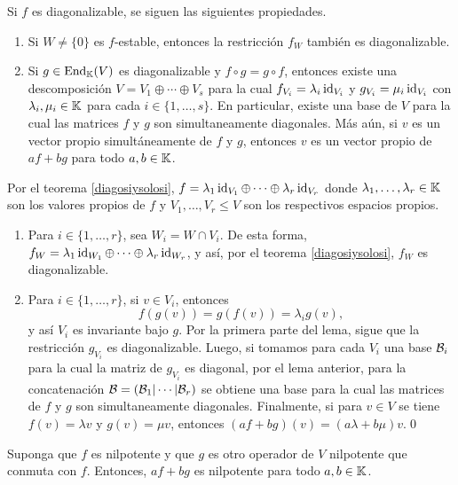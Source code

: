 \begin{lema}
Si $f$ es diagonalizable, se siguen las siguientes propiedades.
\begin{enumerate}
\item Si $W\ne\{0\}$ es $f$-estable, entonces la restricci\'on $f_{W}$ tambi\'en es diagonalizable. 
\item Si $g\in\operatorname{End}_{\mathbb{K}}(V)$ es diagonalizable y $f\circ g=g\circ f$, entonces existe una descomposición $V=V_1\oplus\cdots\oplus V_s$ para la cual $f_{V_i}=\lambda_i\operatorname{id}_{V_i}$ y $g_{V_i}=\mu_i\operatorname{id}_{V_i}$ con $\lambda_i,\mu_i\in \mathbb{K}$ para cada $i\in\{1,\ldots,s\}$. En particular, existe una base de $V$ para la cual las matrices $f$ y $g$ son simultaneamente diagonales. Más aún, si $v$ es un vector propio simult\'aneamente de $f$ y $g$, entonces $v$ es un vector propio de $af+bg$ para todo $a,b\in \mathbb{K}$.
\end{enumerate}
\end{lema}

\dem Por el teorema \ref{diagosiysolosi}, $f=\lambda_1\operatorname{id}_{V_1}\oplus\cdots\oplus\lambda_r\operatorname{id}_{V_r}$ donde $\lambda_1,\ldots,\lambda_r\in\mathbb{K}$ son los valores propios de $f$ y $V_1,\ldots,V_r\le V$ son los respectivos espacios propios.
  \begin{enumerate} 
    \item Para $i\in\{1,\ldots,r\}$, sea $W_i=W\cap V_i$. De esta forma, $f_W=\lambda_1\operatorname{id}_{W_1}\oplus\cdots\oplus\lambda_r\operatorname{id}_{W_r}$, y así, por el teorema \ref{diagosiysolosi}, $f_W$ es diagonalizable.
    \item Para $i\in\{1,\ldots,r\}$, si $v\in V_i$, entonces
      \[
      f\left(g(v)\right)=g\left(f(v)\right)=\lambda_ig(v),
      \]
      y así $V_i$ es invariante bajo $g$. Por la primera parte del lema, sigue que la restricci\'on $g_{V_i}$ es diagonalizable. Luego, si tomamos para cada $V_i$ una base $\mathcal{B}_i$ para la cual la matriz de $g_{V_i}$ es diagonal, por el lema anterior, para la concatenación $\mathcal{B}=(\mathcal{B}_1|\cdots|\mathcal{B}_r)$ se obtiene una base para la cual las matrices de $f$ y $g$ son simultaneamente diagonales. Finalmente, si para $v\in V$ se tiene $f(v)=\lambda v$ y $g(v)=\mu v$, entonces $(af+bg)(v)=(a\lambda+b\mu)v$.\qed 
\end{enumerate}

\begin{lema}
  Suponga que $f$ es nilpotente y que $g$ es otro operador de $V$ nilpotente que conmuta con $f$. Entonces, $af+bg$ es nilpotente para todo $a,b\in\mathbb{K}$.
\end{lema}

